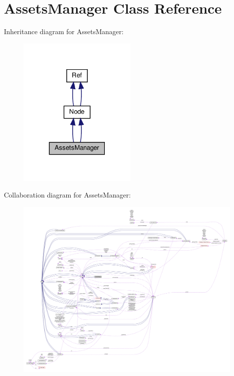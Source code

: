 \hypertarget{classAssetsManager}{}\section{Assets\+Manager Class Reference}
\label{classAssetsManager}


Inheritance diagram for Assets\+Manager\+:
\nopagebreak
\begin{figure}[H]
\begin{center}
\leavevmode
\includegraphics[width=165pt]{classAssetsManager__inherit__graph}
\end{center}
\end{figure}


Collaboration diagram for Assets\+Manager\+:
\nopagebreak
\begin{figure}[H]
\begin{center}
\leavevmode
\includegraphics[width=350pt]{classAssetsManager__coll__graph}
\end{center}
\end{figure}
